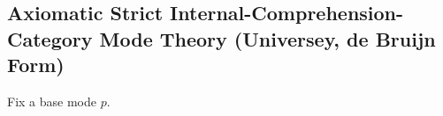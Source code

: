 \documentclass[10pt]{article}
\let\emptyset\varnothing
\newcommand{\yields}{\vdash}
\newcommand\TypeTwo[4]{\ensuremath{#1 \mid #3 \vDash_\mathsf{ty} #2 : #4}}
\newcommand\TermTwoT[5]{\ensuremath{#1 \mid #3 \vDash_{#5} #2 : #4}}
\newcommand\TrPlus[2]{\ensuremath{#1^+(#2)}}
\begin{document}




\subsection{Axiomatic Strict Internal-Comprehension-Category Mode Theory
(Universey, de Bruijn Form)}

\newcommand{\El}[2]{\mathcal{T}_{#1}(#2)}

Fix a base mode $p$.  
\end{document}
